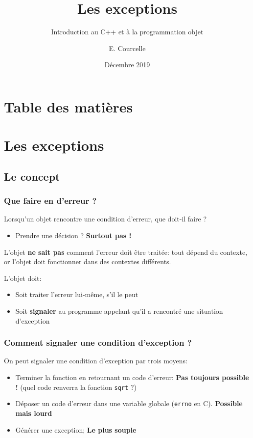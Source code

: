 \documentclass{beamer}
\title{Les exceptions}
\subtitle{Introduction au C++ et à la programmation objet}
\author{E. Courcelle}\institute{CALMIP, UMS 3669}
\date{Décembre 2019}
\begin{document}
\begin{frame}
\titlepage
\end{frame}

\section*{Table des matières}
\begin{frame}
\tableofcontents
\end{frame}


\section{Les exceptions}

\subsection{Le concept}

\begin{frame}[fragile=singleslide,shrink=20]
\frametitle {Que faire en d'erreur ?}

Lorsqu'un objet rencontre une condition d'erreur, que doit-il faire ?
\begin{itemize}
\item{Prendre une décision ? \textbf{Surtout pas !}}
\end{itemize}

L'objet \textbf{ne sait pas} comment l'erreur doit être traitée: tout dépend du contexte, or l'objet doit fonctionner
dans des contextes différents.

L'objet doit:
\begin{itemize}
\item{Soit traiter l'erreur lui-même, s'il le peut}
\item{Soit \textbf{signaler } au programme appelant qu'il a rencontré une situation d'exception}
\end{itemize}
\end{frame}

\begin{frame}[fragile=singleslide,shrink=20]
\frametitle {Comment signaler une condition d'exception ?}

On peut signaler une condition d'exception par trois moyens:
\begin{itemize}
\item{Terminer la fonction en retournant un code d'erreur: \textbf{Pas toujours possible !} (quel code renverra la fonction \texttt{sqrt} ?)}
\item{Déposer un code d'erreur dans une variable globale (\texttt{errno} en C). \textbf{Possible mais lourd}}
\item{Générer une exception; \textbf{Le plus souple}}
\end{itemize}

\end{frame}
\end{document}
